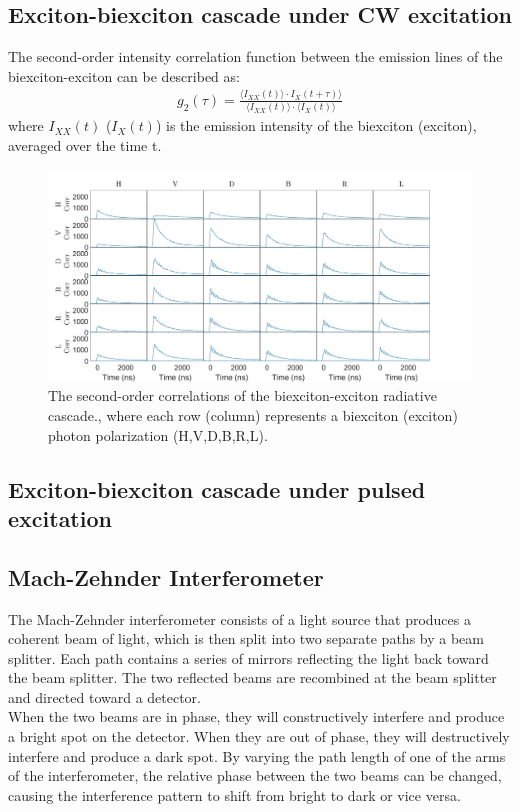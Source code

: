 \subsection{Exciton-biexciton cascade under CW excitation}
The second-order intensity correlation function between the emission lines of the biexciton-exciton can be described as:
\begin{equation} \label{second_order_correlations}
\begin{aligned} 
        g_2(\tau) = \frac{\langle I_{XX}(t) \rangle\cdot  I_{X}(t+\tau) \rangle}{\langle I_{XX}(t)\rangle \cdot\langle I_{X}(t)\rangle}
\end{aligned}
\end{equation}
where $I_{XX}(t)$ ($I_X(t)$) is the emission intensity of the biexciton (exciton), averaged over the time t.
\begin{figure}[H]
	\centering
	\includegraphics[scale=0.24]{figures/XX_X_Correlations.jpg}
	\caption{ The second-order correlations of the biexciton-exciton radiative cascade., where each row (column) represents a biexciton (exciton) photon polarization (H,V,D,B,R,L).}
	\label{fig:XX_X_Correlations}
\end{figure}
\subsection{Exciton-biexciton cascade under pulsed excitation}
\subsection{Mach-Zehnder Interferometer}
The Mach-Zehnder interferometer consists of a light source that produces a coherent beam of light, which is then split into two separate paths by a beam splitter. Each path contains a series of mirrors reflecting the light back toward the beam splitter. The two reflected beams are recombined at the beam splitter and directed toward a detector.\\
When the two beams are in phase, they will constructively interfere and produce a bright spot on the detector. When they are out of phase, they will destructively interfere and produce a dark spot. By varying the path length of one of the arms of the interferometer, the relative phase between the two beams can be changed, causing the interference pattern to shift from bright to dark or vice versa.
